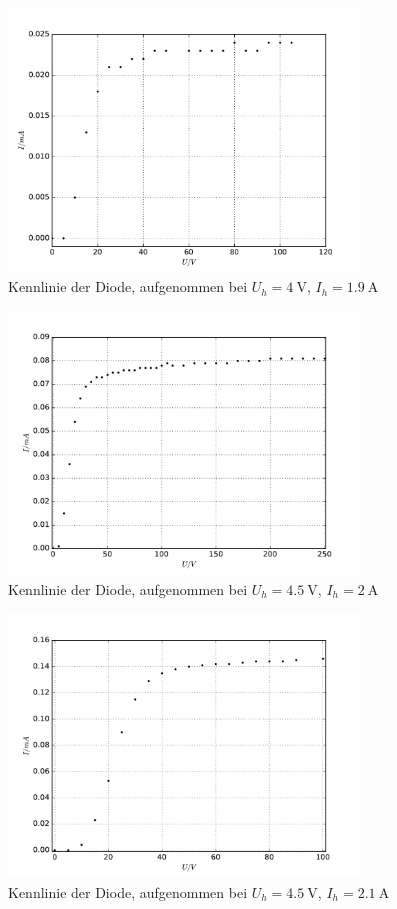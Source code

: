 \begin{figure}
  \centering
  \includegraphics[height=7cm]{./plots/Plot2.pdf}
  \caption{Kennlinie der Diode, aufgenommen bei $U_h = \SI{4}{\volt}$, $I_h = \SI{1.9}{\ampere}$}
  \label{fig:Plot2}
\end{figure}

\begin{figure}
  \centering
  \includegraphics[height=7cm]{./plots/Plot3.pdf}
  \caption{Kennlinie der Diode, aufgenommen bei $U_h = \SI{4.5}{\volt}$, $I_h = \SI{2}{\ampere}$}
  \label{fig:Plot3}
\end{figure}

\begin{figure}
  \centering
  \includegraphics[height=7cm]{./plots/Plot4.pdf}
  \caption{Kennlinie der Diode, aufgenommen bei $U_h = \SI{4.5}{\volt}$, $I_h = \SI{2.1}{\ampere}$}
  \label{fig:Plot4}
\end{figure}

